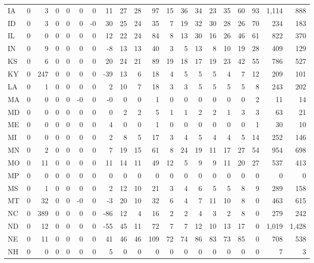 \begin{longtable}{lrrrrrrrrrrrrrrrrrrr}
IA & 0 & 3 & 0 & 0 & 0 & 0 & 11 & 27 & 28 & 97 & 15 & 36 & 34 & 23 & 35 & 60 & 93 & 1,114 & 888 \\
ID & 0 & 3 & 0 & 0 & 0 & -0 & 30 & 25 & 24 & 35 & 7 & 19 & 32 & 30 & 28 & 26 & 70 & 234 & 183 \\
IL & 0 & 0 & 0 & 0 & 0 & 0 & 12 & 22 & 24 & 84 & 8 & 13 & 30 & 16 & 26 & 46 & 61 & 822 & 370 \\
IN & 0 & 9 & 0 & 0 & 0 & 0 & -8 & 13 & 13 & 40 & 3 & 5 & 13 & 8 & 10 & 19 & 28 & 409 & 129 \\
KS & 0 & 6 & 0 & 0 & 0 & 0 & 20 & 24 & 21 & 89 & 19 & 18 & 17 & 19 & 23 & 42 & 55 & 786 & 527 \\
KY & 0 & 247 & 0 & 0 & 0 & 0 & -39 & 13 & 6 & 18 & 4 & 5 & 5 & 5 & 4 & 7 & 12 & 209 & 101 \\
LA & 0 & 1 & 0 & 0 & 0 & 0 & 2 & 10 & 7 & 18 & 3 & 3 & 5 & 5 & 5 & 5 & 8 & 243 & 202 \\
MA & 0 & 0 & 0 & 0 & -0 & 0 & -0 & 0 & 0 & 1 & 0 & 0 & 0 & 0 & 0 & 0 & 2 & 11 & 14 \\
MD & 0 & 0 & 0 & 0 & 0 & 0 & 0 & 2 & 2 & 5 & 1 & 1 & 2 & 2 & 1 & 3 & 3 & 63 & 21 \\
ME & 0 & 0 & 0 & 0 & 0 & 0 & 4 & 0 & 0 & 1 & 0 & 0 & 0 & 0 & 0 & 0 & 1 & 30 & 10 \\
MI & 0 & 0 & 0 & 0 & 0 & 0 & 2 & 8 & 5 & 17 & 3 & 4 & 5 & 4 & 4 & 5 & 14 & 252 & 146 \\
MN & 0 & 2 & 0 & 0 & 0 & 0 & 7 & 19 & 15 & 61 & 8 & 24 & 19 & 11 & 17 & 27 & 54 & 954 & 698 \\
MO & 0 & 11 & 0 & 0 & 0 & 0 & 11 & 14 & 11 & 49 & 12 & 5 & 9 & 9 & 11 & 20 & 27 & 537 & 413 \\
MP & 0 & 0 & 0 & 0 & 0 & 0 & 0 & 0 & 0 & 0 & 0 & 0 & 0 & 0 & 0 & 0 & 0 & 0 & 0 \\
MS & 0 & 1 & 0 & 0 & 0 & 0 & 2 & 12 & 10 & 21 & 3 & 4 & 6 & 5 & 5 & 8 & 9 & 289 & 158 \\
MT & 0 & 32 & 0 & 0 & -0 & 0 & -3 & 20 & 10 & 32 & 6 & 4 & 7 & 11 & 10 & 8 & 0 & 463 & 615 \\
NC & 0 & 389 & 0 & 0 & 0 & 0 & -86 & 12 & 4 & 16 & 2 & 2 & 4 & 3 & 2 & 8 & 0 & 279 & 242 \\
ND & 0 & 12 & 0 & 0 & 0 & 0 & -55 & 45 & 11 & 72 & 7 & 7 & 12 & 10 & 13 & 17 & 0 & 1,019 & 1,428 \\
NE & 0 & 11 & 0 & 0 & 0 & 0 & 41 & 46 & 46 & 109 & 72 & 74 & 86 & 83 & 73 & 85 & 0 & 708 & 538 \\
NH & 0 & 0 & 0 & 0 & 0 & 0 & 5 & 0 & 0 & 0 & 0 & 0 & 0 & 0 & 0 & 0 & 0 & 7 & 3 \\

\end{longtable}
